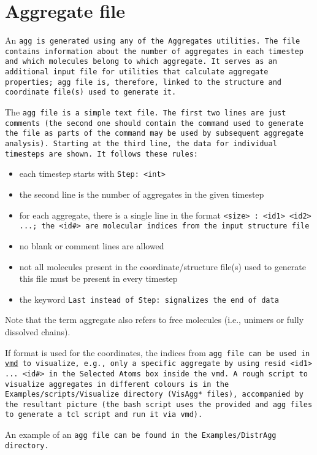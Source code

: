 \section{Aggregate file} \label{sec:AggFile} %

An \tt{agg} is generated using any of the \tt{Aggregates} utilities. The file
contains information about the number of aggregates in each timestep and which
molecules
belong to which aggregate. It serves as an additional input file for utilities
that calculate aggregate properties; \tt{agg} file is, therefore, linked to the
structure and coordinate file(s) used to generate it.

The \tt{agg} file is a simple text file. The first two lines are just comments
(the second one should contain the command used to generate the file as parts of
the command may be used by subsequent aggregate analysis). Starting at the third
line, the data for individual timesteps are shown. It follows these rules:

\begin{itemize}[topsep=0pt,itemsep=0pt]
  \item each timestep starts with \tt{Step: <int>}
  \item the second line is the number of aggregates in the given timestep
  \item for each aggregate, there is a single line in the format \tt{<size> :
    <id1> <id2> ...}; the \tt{<id\#>} are molecular indices from the
    input structure file
  \item no blank or comment lines are allowed
  \item not all molecules present in the coordinate/structure file(s) used to
    generate this file must be present in every timestep
  \item the keyword \tt{Last} instead of \tt{Step:} signalizes the end of data
\end{itemize}

Note that the term aggregate also refers to free molecules (i.e., unimers or
fully dissolved chains).

If \vtf format is used for the coordinates, the indices from \tt{agg} file can
be used in \href{http://www.ks.uiuc.edu/Research/vmd/}{vmd} to visualize, e.g.,
only a specific aggregate by using \tt{resid <id1> ... <id\#>} in the
\tt{Selected Atoms} box inside the vmd. A rough script to visualize aggregates
in different colours is in the \tt{Examples/scripts/Visualize} directory
(\tt{VisAgg*} files),
accompanied by the resultant picture (the bash script uses the
provided \vtf and \tt{agg} files to generate a \tt{tcl} script and run it via
\tt{vmd}).

An example of an \tt{agg} file can be found in the \tt{Examples/DistrAgg}
directory. %
